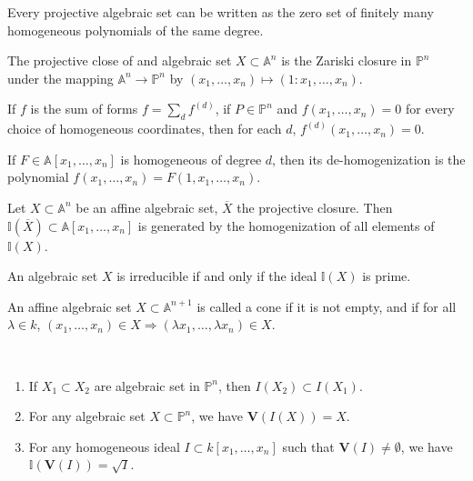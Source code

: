\documentclass[crop=false,class=article,oneside]{standalone}
\begin{document}
    \begin{theorem}
    Every projective algebraic set can be written as the zero set of finitely many homogeneous polynomials of the same degree.
    \end{theorem}
    \begin{definition}
    The projective close of and algebraic set $X\subset \mathbb{A}^n$ is the Zariski closure in $\mathbb{P}^n$ under the mapping $\mathbb{A}^n \rightarrow \mathbb{P}^n$ by $(x_1,\hdots, x_n) \mapsto (1:x_1,\hdots, x_n)$.
    \end{definition}
    \begin{theorem}
    If $f$ is the sum of forms $f = \sum_{d} f^{(d)}$, if $P\in \mathbb{P}^n$ and $f(x_1,\hdots, x_n) = 0$ for every choice of homogeneous coordinates, then for each $d$, $f^{(d)}(x_1,\hdots, x_n) = 0$.
    \end{theorem}
    \begin{definition}
    If $F\in \mathbb{A}[x_1,\hdots, x_n]$ is homogeneous of degree $d$, then its de-homogenization is the polynomial $f(x_1,\hdots, x_n) = F(1,x_1,\hdots, x_n)$.
    \end{definition}
    \begin{theorem}
    Let $X\subset \mathbb{A}^n$ be an affine algebraic set, $\overline{X}$ the projective closure. Then $\mathbb{I}(\overline{X})\subset \mathbb{A}[x_1,\hdots, x_n]$ is generated by the homogenization of all elements of $\mathbb{I}(X)$.
    \end{theorem}
    \begin{theorem}
    An algebraic set $X$ is irreducible if and only if the ideal $\mathbb{I}(X)$ is prime.
    \end{theorem}
    \begin{definition}
    An affine algebraic set $X\subset \mathbb{A}^{n+1}$ is called a cone if it is not empty, and if for all $\lambda \in k$, $(x_1,\hdots, x_n) \in X \Rightarrow (\lambda x_1,\hdots, \lambda x_n)\in X$.
    \end{definition}
    \begin{theorem}
    \
    \begin{enumerate}
        \item If $X_1\subset X_2$ are algebraic set in $\mathbb{P}^n$, then $I(X_2)\subset I(X_1)$.
        \item For any algebraic set $X\subset \mathbb{P}^n$, we have $\mathbf{V}(I(X)) = X$.
        \item For any homogeneous ideal $I\subset k[x_1,\hdots ,x_n]$ such that $\mathbf{V}(I)\ne \emptyset$, we have $\mathbb{I}(\mathbf{V}(I)) = \sqrt{I}$.
    \end{enumerate}
    \end{theorem}
\end{document}
